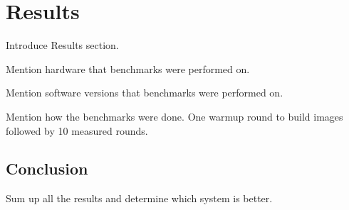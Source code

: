 \section{Results}

Introduce Results section.

Mention hardware that benchmarks were performed on.

Mention software versions that benchmarks were performed on.

Mention how the benchmarks were done.
One warmup round to build images followed by 10 measured rounds.









\subsection{Conclusion}

Sum up all the results and determine which system is better.
